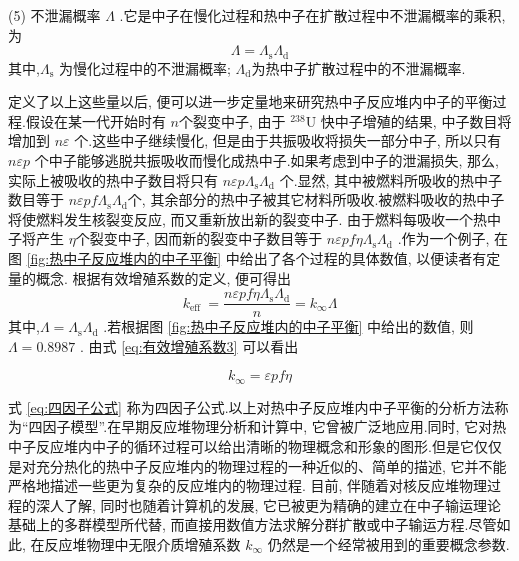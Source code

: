 \documentclass{Sichuan Normal University}
\begin{document}
(5) 不泄漏概率 $\Lambda$ .它是中子在慢化过程和热中子在扩散过程中不泄漏概率的乘积, 为
\begin{equation}
\Lambda=\Lambda_{\mathrm{s}} \Lambda_{\mathrm{d}}
\end{equation}
其中,$\Lambda_{\mathrm{s}}$ 为慢化过程中的不泄漏概率; $\Lambda_{\mathrm{d}}$为热中子扩散过程中的不泄漏概率.

定义了以上这些量以后, 便可以进一步定量地来研究热中子反应堆内中子的平衡过程.假设在某一代开始时有 $n$个裂变中子, 由于 ${ }^{238} \mathrm{U}$ 快中子增殖的结果, 中子数目将增加到 $n \varepsilon$ 个.这些中子继续慢化, 但是由于共振吸收将损失一部分中子, 所以只有 $n \varepsilon p$ 个中子能够逃脱共振吸收而慢化成热中子.如果考虑到中子的泄漏损失, 
那么, 实际上被吸收的热中子数目将只有 $n \varepsilon p \Lambda_{\mathrm{s}} \Lambda_{\mathrm{d}}$ 个.显然, 其中被燃料所吸收的热中子数目等于 $n \varepsilon p f \Lambda_{\mathrm{s}} \Lambda_{\mathrm{d}}$个, 其余部分的热中子被其它材料所吸收.被燃料吸收的热中子将使燃料发生核裂变反应, 而又重新放出新的裂变中子.
由于燃料每吸收一个热中子将产生 $\eta$个裂变中子, 因而新的裂变中子数目等于 $n \varepsilon p f \eta \Lambda_{\mathrm{s}} \Lambda_{\mathrm{d}}$ .作为一个例子, 在图 \ref{fig:热中子反应堆内的中子平衡} 中给出了各个过程的具体数值, 以便读者有定量的概念.
根据有效增殖系数的定义, 便可得出
\begin{equation}
k_{\text {eff }}=\frac{n \varepsilon p f \eta \Lambda_{\mathrm{s}} \Lambda_{\mathrm{d}}}{n}=k_{\infty} \Lambda
\end{equation}
其中,$\Lambda=\Lambda_{\mathrm{s}} \Lambda_{\mathrm{d}}$ .若根据图 \ref{fig:热中子反应堆内的中子平衡} 中给出的数值, 则 $\Lambda=0.8987$ .
由式 \eqref{eq:有效增殖系数3} 可以看出

\begin{equation}
k_{\infty}=\varepsilon p f \eta
\label{eq:四因子公式}
\end{equation}

式 \eqref{eq:四因子公式} 称为四因子公式.以上对热中子反应堆内中子平衡的分析方法称为“四因子模型”.在早期反应堆物理分析和计算中, 它曾被广泛地应用.同时, 它对热中子反应堆内中子的循环过程可以给出清晰的物理概念和形象的图形.但是它仅仅是对充分热化的热中子反应堆内的物理过程的一种近似的、简单的描述, 它并不能严格地描述一些更为复杂的反应堆内的物理过程.
目前, 伴随着对核反应堆物理过程的深人了解, 同时也随着计算机的发展, 它已被更为精确的建立在中子输运理论基础上的多群模型所代替, 而直接用数值方法求解分群扩散或中子输运方程.尽管如此, 在反应堆物理中无限介质增殖系数 $k_{\infty}$ 仍然是一个经常被用到的重要概念参数.
  
\end{document}
